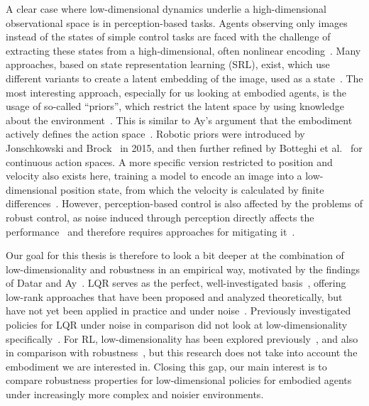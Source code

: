 A clear case where low-dimensional dynamics underlie a high-dimensional observational space is in perception-based tasks.
Agents observing only images instead of the states of simple control tasks are faced with the challenge of extracting
these states from a high-dimensional, often nonlinear encoding~\cite[Sec.~1]{Watter2015Embed}. Many approaches, based on
state representation learning (SRL), exist, which use different variants to create a latent embedding of the image,
used as a state~\cite{Lesort2018State}. The most interesting approach, especially for us looking at embodied agents, is
the usage of so-called ``priors'', which restrict the latent space by using knowledge about the
environment~\cite[Sec.~2.2]{Lesort2018State}.
This is similar to Ay's argument that the embodiment actively defines the action space~\cite[Sec.~1]{Ay2015Geometric}.
Robotic priors were introduced by Jonschkowski and Brock~\cite{Jonschkowski2015Learning} in 2015, and then further
refined by Botteghi et al.~\cite{Botteghi2021LowDimensional} for continuous action spaces. A more specific version
restricted to position and velocity also exists here, training a model to encode an image into a low-dimensional
position state, from which the velocity is calculated by finite differences~\cite{Jonschkowski2017PVE}.
However, perception-based control is also affected by the problems of robust control,
as noise induced through perception directly affects the performance~\cite[Sec.~3.3]{Xu2021Perception}
and therefore requires approaches for mitigating it~\cite{Dean2020Robust}.

Our goal for this thesis is therefore to look a bit deeper at the combination of low-dimensionality
and robustness in an empirical way, motivated by the findings of Datar and Ay~\cite{Datar2025Universal}. LQR
serves as the perfect, well-investigated basis~\cite{Recht2019Tour}, offering low-rank approaches that have been proposed
and analyzed theoretically, but have not yet been applied in practice and under noise~\cite[Sec.~4]{Park2020Structured}. Previously
investigated policies for LQR under noise in comparison did not look at low-dimensionality
specifically~\cite{Zhang2021Policy}.
For RL, low-dimensionality has been explored
previously~\cite{Agarwal2020FLAMBE,Stojanovic2024ModelFree}, and also
in comparison with robustness~\cite{Li2025AdaRL}, but this research does not take into account the embodiment we are interested in.
Closing this gap, our main interest is to compare robustness properties for low-dimensional policies for embodied
agents under increasingly more complex and noisier environments.

